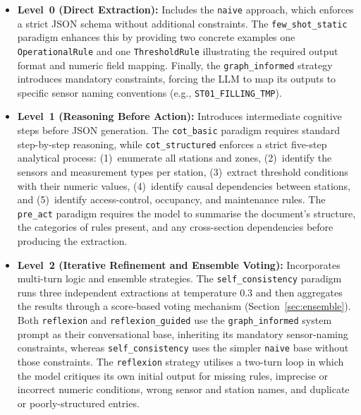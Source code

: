 ﻿\documentclass[11pt]{article}
\begin{document}
\begin{itemize}
    \item \textbf{Level~0 (Direct Extraction):} Includes the \texttt{naive} approach,
          which enforces a strict JSON schema without additional constraints.
          The \texttt{few\_shot\_static} paradigm enhances this by providing two
          concrete examples one \texttt{OperationalRule} and one
          \texttt{ThresholdRule} illustrating the required output format and numeric
          field mapping. Finally, the \texttt{graph\_informed} strategy introduces
          mandatory constraints, forcing the LLM to map its outputs to specific sensor
          naming conventions (e.g., \texttt{ST01\_FILLING\_TMP}).
    \item \textbf{Level~1 (Reasoning Before Action):} Introduces intermediate
          cognitive steps before JSON generation. The \texttt{cot\_basic} paradigm
          requires standard step-by-step reasoning, while \texttt{cot\_structured}
          enforces a strict five-step analytical process: (1)~enumerate all stations
          and zones, (2)~identify the sensors and measurement types per station,
          (3)~extract threshold conditions with their numeric values,
          (4)~identify causal dependencies between stations, and
          (5)~identify access-control, occupancy, and maintenance rules.
          The \texttt{pre\_act} paradigm requires the model to summarise the
          document's structure, the categories of rules present, and any
          cross-section dependencies before producing the extraction.
    \item \textbf{Level~2 (Iterative Refinement and Ensemble Voting):} Incorporates
          multi-turn logic and ensemble strategies. The \texttt{self\_consistency}
          paradigm runs three independent extractions at temperature $0.3$ and then
          aggregates the results through a score-based voting mechanism
          (Section~\ref{sec:ensemble}). Both \texttt{reflexion} and
          \texttt{reflexion\_guided} use the \texttt{graph\_informed} system prompt
          as their conversational base, inheriting its mandatory sensor-naming
          constraints, whereas \texttt{self\_consistency} uses the simpler
          \texttt{naive} base without those constraints.
          The \texttt{reflexion} strategy utilises a two-turn loop in which the model
          critiques its own initial output for missing rules, imprecise or incorrect
          numeric conditions, wrong sensor and station names, and duplicate or
          poorly-structured entries.

\end{itemize}
\end{document}
